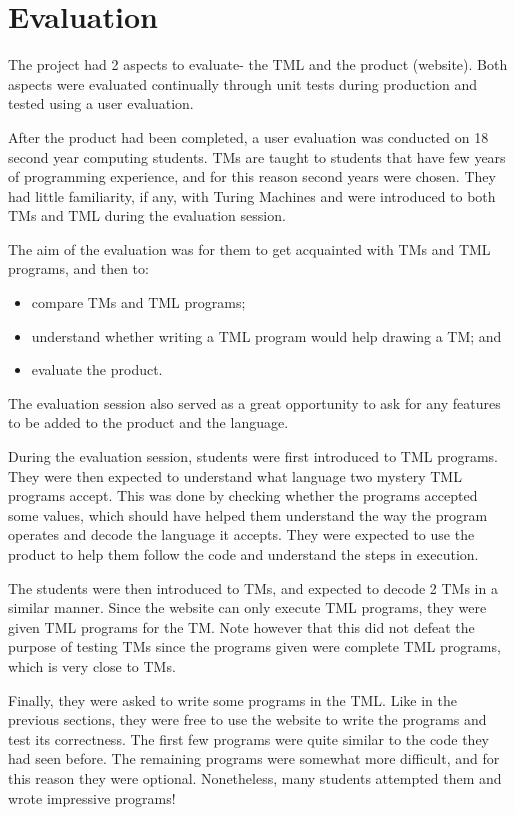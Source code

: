 \chapter{Evaluation} 
The project had 2 aspects to evaluate- the TML and the product (website). Both aspects were evaluated continually through unit tests during production and tested using a user evaluation.

After the product had been completed, a user evaluation was conducted on 18 second year computing students. TMs are taught to students that have few years of programming experience, and for this reason second years were chosen. They had little familiarity, if any, with Turing Machines and were introduced to both TMs and TML during the evaluation session. 

The aim of the evaluation was for them to get acquainted with TMs and TML programs, and then to:
\begin{itemize}
    \item compare TMs and TML programs;
    \item understand whether writing a TML program would help drawing a TM; and
    \item evaluate the product.
\end{itemize}
The evaluation session also served as a great opportunity to ask for any features to be added to the product and the language.

During the evaluation session, students were first introduced to TML programs. They were then expected to understand what language two mystery TML programs accept. This was done by checking whether the programs accepted some values, which should have helped them understand the way the program operates and decode the language it accepts. They were expected to use the product to help them follow the code and understand the steps in execution. 

The students were then introduced to TMs, and expected to decode 2 TMs in a similar manner. Since the website can only execute TML programs, they were given TML programs for the TM. Note however that this did not defeat the purpose of testing TMs since the programs given were complete TML programs, which is very close to TMs.

Finally, they were asked to write some programs in the TML. Like in the previous sections, they were free to use the website to write the programs and test its correctness. The first few programs were quite similar to the code they had seen before. The remaining programs were somewhat more difficult, and for this reason they were optional. Nonetheless, many students attempted them and wrote impressive programs! 

